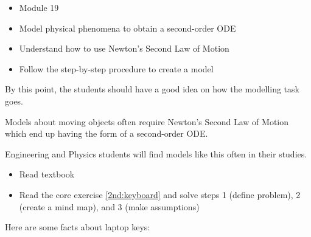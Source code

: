 \begin{lesson}

	\begin{itemize}
		\item Module 19
	\end{itemize}

	\begin{itemize}
		\item Model physical phenomena to obtain a second-order ODE
		\item Understand how to use Newton's Second Law of Motion
		\item Follow the step-by-step procedure to create a model
	\end{itemize}
	

By this point, the students should have a good idea on how the modelling task goes.

Models about moving objects often require Newton's Second Law of Motion which end up having the form of a second-order ODE.

Engineering and Physics students will find models like this often in their studies.



\begin{itemize}
	\item Read textbook
	\item Read the core exercise \ref{2nd:keyboard} and solve steps 1 (define problem), 2 (create a mind map), and 3 (make assumptions)
\end{itemize}


\end{lesson}




\question \label{2nd:keyboard}
	Here are some facts about laptop keys:

